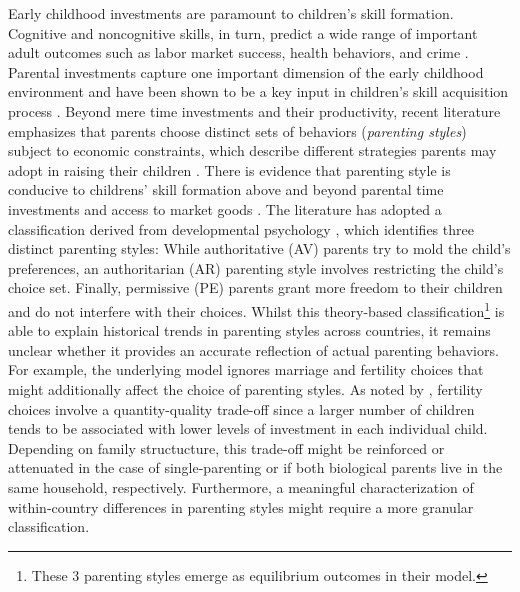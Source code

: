 Early childhood investments are paramount to children's skill formation. Cognitive and noncognitive skills, in turn, predict a wide range of important adult outcomes such as labor market success, health behaviors, and crime \parencites[e.g.][]{heckmanEffectsCognitiveNoncognitive2006}{almlundPersonalityPsychologyEconomics2011}. Parental investments capture one important dimension of the early childhood environment and have been shown to be a key input in children's skill acquisition process \parencites[e.g.][]{falkSocioEconomicStatusInequalities2021}{attanasioEstimatingProductionFunction2020}. Beyond mere time investments and their productivity, recent literature emphasizes that parents choose distinct sets of behaviors (\textit{parenting styles}) subject to economic constraints, which describe different strategies parents may adopt in raising their children \parencites{doepkeParentingStyleAltruism2017}{doepkeEconomicsParenting2019}. There is evidence that parenting style is conducive to childrens' skill formation above and beyond parental time investments and access to market goods \parencite{cobb-clarkParentingStyleInvestment2019}. The literature has adopted a classification derived from developmental psychology \parencite{baumrindChildCarePractices1967}, which identifies three distinct parenting styles: While authoritative (AV) parents try to mold the child's preferences, an authoritarian (AR) parenting style involves restricting the child's choice set. Finally, permissive (PE) parents grant more freedom to their children and do not interfere with their choices. Whilst this theory-based classification\footnote{These 3 parenting styles emerge as equilibrium outcomes in their model.} is able to explain historical trends in parenting styles across countries, it remains unclear whether it provides an accurate reflection of actual parenting behaviors. For example, the underlying model ignores marriage and fertility choices that might additionally affect the choice of parenting styles. As noted by \textcite{beckerTreatiseFamily1981}, fertility choices involve a quantity-quality trade-off since a larger number of children tends to be associated with lower levels of investment in each individual child. Depending on family structucture, this trade-off might be reinforced or attenuated in the case of single-parenting or if both biological parents live in the same household, respectively. Furthermore, a meaningful characterization of within-country differences in parenting styles might require a more granular classification.

